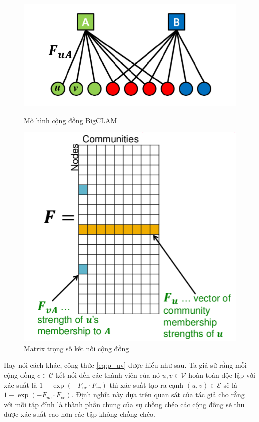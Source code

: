 \begin{figure}[H]
	\centering
	\begin{minipage}[t]{0.48\textwidth}
		\centering
		\includegraphics[width=\linewidth]{Chapter3/Chapter3Figs/bigclam-diagram}
		\caption{Mô hình cộng đồng BigCLAM}
		\label{fig:bigclam-diagram}
	\end{minipage}
	\begin{minipage}[t]{0.48\textwidth}
		\centering
		\includegraphics[width=0.7\linewidth]{Chapter3/Chapter3Figs/fmatrixvector.png}
		\caption{Matrix trọng số kết nối cộng đồng}
		\label{fig:matrixbigclam-diagram}
	\end{minipage}    
\end{figure}
Hay nói cách khác, công thức \ref{eq:p_uv} được hiểu như sau. Ta giả sử rằng mỗi cộng đồng $c \in \mathcal{C}$ kết nối đến các thành viên của nó $u,v \in \mathcal{V}$ hoàn toàn độc lập với xác suất là $1-\exp(-F_{uc}\cdot F_{vc})$ thì xác suất tạo ra cạnh $(u,v) \in \mathcal{E}$ sẽ là $1-\exp(-F_{uc}\cdot F_{vc})$. Định nghĩa này dựa trên quan sát của tác giả cho rằng với mỗi tập đỉnh là thành phần chung của sự chồng chéo các cộng đồng sẽ thu được xác suất cao hơn các tập không chồng chéo.

